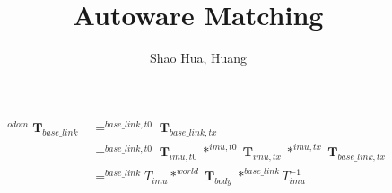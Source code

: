 \documentclass[12pt]{article}
\title{Autoware Matching}
\author{Shao Hua, Huang}
\DeclareMathOperator{\T}{\mathbf{T}}
\begin{document}
\maketitle
\begin{align*}
^{odom}\T_{base\_link} & = ^{base\_link, t0}\T_{base\_link, tx}\\
                      & = ^{base\_link, t0}\T_{imu, t0} * ^{imu, t0}\T_{imu, tx} * ^{imu, tx}\T_{base\_link, tx}\\
                      & = ^{base\_link}T_{imu} * ^{world}\T_{body} * ^{base\_link}T_{imu}^{-1}
\end{align*}
\end{document}
